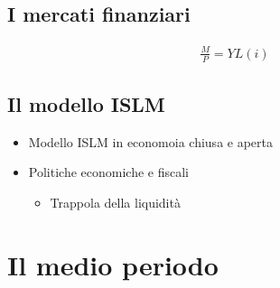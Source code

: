 \documentclass[letterpaper,10pt,italian]{jupyterBook}
\begin{document}
\subsection{I mercati finanziari}
\label{\detokenize{ch/macro:i-mercati-finanziari}}\label{\detokenize{ch/macro:economics-hs-macro-short-run-financial-market}}\begin{equation*}
\begin{split}\frac{M}{P} = Y L(i)\end{split}
\end{equation*}

\subsection{Il modello IS\sphinxhyphen{}LM}
\label{\detokenize{ch/macro:il-modello-is-lm}}\label{\detokenize{ch/macro:economics-hs-macro-short-run-is-lm}}\begin{itemize}
\item {} 
\sphinxAtStartPar
Modello IS\sphinxhyphen{}LM in economoia chiusa e aperta

\item {} 
\sphinxAtStartPar
Politiche economiche e fiscali
\begin{itemize}
\item {} 
\sphinxAtStartPar
Trappola della liquidità

\end{itemize}

\end{itemize}


\section{Il medio periodo}
\label{\detokenize{ch/macro:il-medio-periodo}}\label{\detokenize{ch/macro:economics-hs-macro-medium-run}}
\end{document}
